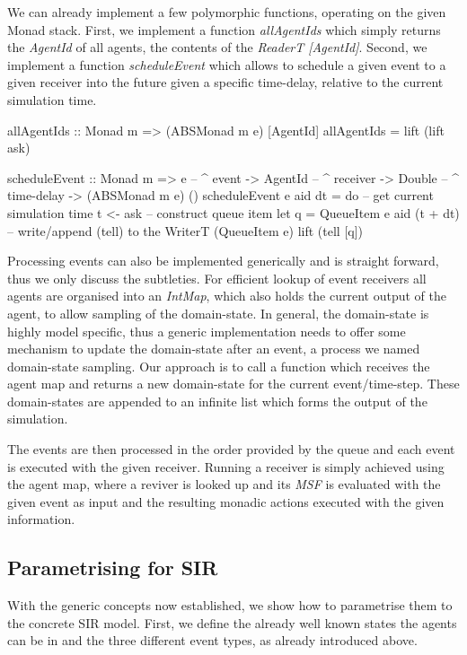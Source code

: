 We can already implement a few polymorphic functions, operating on the given Monad stack. First, we implement a function \textit{allAgentIds} which simply returns the \textit{AgentId} of all agents, the contents of the \textit{ReaderT [AgentId]}. Second, we implement a function \textit{scheduleEvent} which allows to schedule a given event to a given receiver into the future given a specific time-delay, relative to the current simulation time.
 
\begin{HaskellCode}
allAgentIds :: Monad m => (ABSMonad m e) [AgentId]
allAgentIds = lift (lift ask)

scheduleEvent :: Monad m
              => e        -- ^ event
              -> AgentId  -- ^ receiver
              -> Double   -- ^ time-delay
              -> (ABSMonad m e) ()
scheduleEvent e aid dt = do
  -- get current simulation time
  t <- ask
  -- construct queue item
  let q = QueueItem e aid (t + dt)
  -- write/append (tell) to the WriterT (QueueItem e)
  lift (tell [q])
\end{HaskellCode}

Processing events can also be implemented generically and is straight forward, thus we only discuss the subtleties. For efficient lookup of event receivers all agents are organised into an \textit{IntMap}, which also holds the current output of the agent, to allow sampling of the domain-state. In general, the domain-state is highly model specific, thus a generic implementation needs to offer some mechanism to update the domain-state after an event, a process we named domain-state sampling. Our approach is to call a function which receives the agent map and returns a new domain-state for the current event/time-step. These domain-states are appended to an infinite list which forms the output of the simulation.

The events are then processed in the order provided by the queue and each event is executed with the given receiver. Running a receiver is simply achieved using the agent map, where a reviver is looked up and its \textit{MSF} is evaluated with the given event as input and the resulting monadic actions executed with the given information.
 
\subsection{Parametrising for SIR}
With the generic concepts now established, we show how to parametrise them to the concrete SIR model. First, we define the already well known states the agents can be in and the three different event types, as already introduced above.

